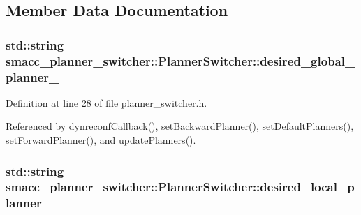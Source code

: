 \subsection{Member Data Documentation}
\subsubsection[{\texorpdfstring{desired\+\_\+global\+\_\+planner\+\_\+}{desired_global_planner_}}]{\setlength{\rightskip}{0pt plus 5cm}std\+::string smacc\+\_\+planner\+\_\+switcher\+::\+Planner\+Switcher\+::desired\+\_\+global\+\_\+planner\+\_\+\hspace{0.3cm}{\ttfamily [private]}}\hypertarget{classsmacc__planner__switcher_1_1PlannerSwitcher_aed229df648a0903e3cdf77682220efb5}{}\label{classsmacc__planner__switcher_1_1PlannerSwitcher_aed229df648a0903e3cdf77682220efb5}


Definition at line 28 of file planner\+\_\+switcher.\+h.



Referenced by dynreconf\+Callback(), set\+Backward\+Planner(), set\+Default\+Planners(), set\+Forward\+Planner(), and update\+Planners().

\subsubsection[{\texorpdfstring{desired\+\_\+local\+\_\+planner\+\_\+}{desired_local_planner_}}]{\setlength{\rightskip}{0pt plus 5cm}std\+::string smacc\+\_\+planner\+\_\+switcher\+::\+Planner\+Switcher\+::desired\+\_\+local\+\_\+planner\+\_\+\hspace{0.3cm}{\ttfamily [private]}}\hypertarget{classsmacc__planner__switcher_1_1PlannerSwitcher_aecc5958653ed39dd7611783043d23345}{}\label{classsmacc__planner__switcher_1_1PlannerSwitcher_aecc5958653ed39dd7611783043d23345}


